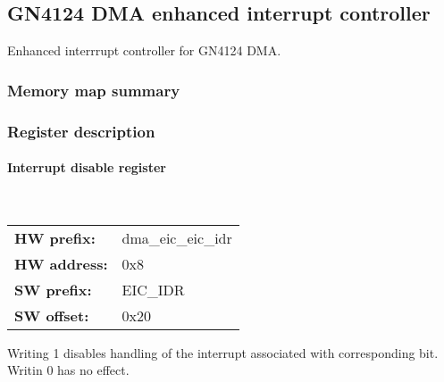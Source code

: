 \subsection{GN4124 DMA enhanced interrupt controller}
\label{subsec:wbgen:dma_eic}
Enhanced interrrupt controller for GN4124 DMA.
\subsubsection{Memory map summary}

\subsubsection{Register description}
\paragraph*{Interrupt disable register}\mbox{}\\\vskip 6pt
\begin{tabular}{l l }
{\bf HW prefix:}  & dma\_eic\_eic\_idr\\
{\bf HW address:}  & 0x8\\
{\bf SW prefix:}  & EIC\_IDR\\
{\bf SW offset:}  & 0x20\\
\end{tabular}

\vspace{12pt}
Writing 1 disables handling of the interrupt associated with corresponding bit. Writin 0 has no effect.

